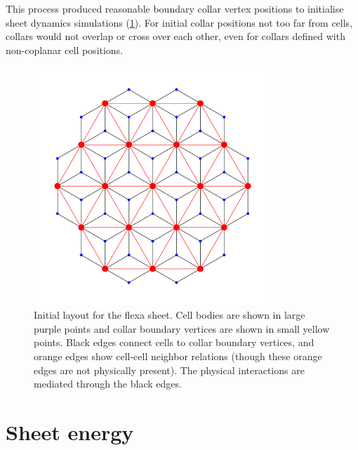 This process produced reasonable boundary collar vertex positions to initialise sheet dynamics simulations (\cref{fig:layout_init}). 
For initial collar positions not too far from cells, collars would not overlap or cross over each other, even for collars defined with non-coplanar cell positions. 


\begin{figure}[hbtp]
    \centering
    \includegraphics[width=0.8\textwidth]{layout_init.png}
    \caption[Initial layout of the hexagonal lattice flexa sheet]{Initial layout for the flexa sheet. Cell bodies are shown in large purple points and collar boundary vertices are shown in small yellow points. Black edges connect cells to collar boundary vertices, and orange edges show cell-cell neighbor relations (though these orange edges are not physically present). The physical interactions are mediated through the black edges.}
    \label{fig:layout_init}
\end{figure}

\section{Sheet energy}

